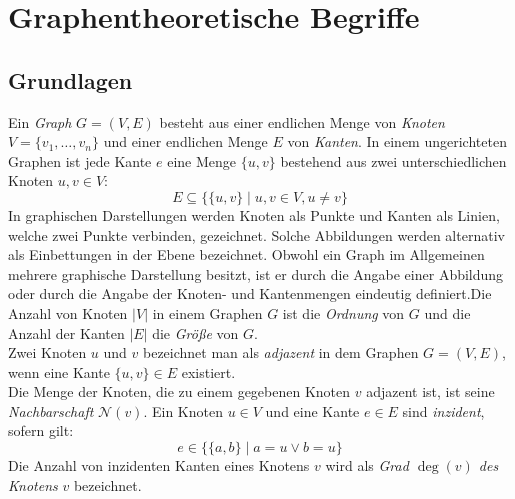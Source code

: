 \section{Graphentheoretische Begriffe}
\label{chap_prel}
\subsection{Grundlagen}
Ein \emph{Graph} $G = (V, E)$ besteht aus einer endlichen Menge von \emph{Knoten} $V = \{v_1 ,\ldots, v_n\}$ und einer endlichen Menge $E$ von \emph{Kanten}. In einem ungerichteten Graphen ist jede Kante $e$ eine Menge $\{u, v\}$ bestehend aus zwei unterschiedlichen Knoten $u, v \in V$:
$$E \subseteq \{\{u, v\}\; |\; u, v \in V, u \neq v\}$$
In graphischen Darstellungen werden Knoten als Punkte und Kanten als Linien, welche zwei Punkte verbinden, gezeichnet. Solche Abbildungen werden alternativ als Einbettungen in der Ebene bezeichnet. Obwohl ein Graph im Allgemeinen mehrere graphische Darstellung besitzt, ist er durch die Angabe einer Abbildung oder durch die Angabe der Knoten- und Kantenmengen eindeutig definiert.\newline \newline Die Anzahl von Knoten $|V|$ in einem Graphen $G$ ist die \emph{Ordnung} von $G$ und die Anzahl der Kanten $|E|$ die \emph{Größe} von $G$.\\Zwei Knoten $u$ und $v$ bezeichnet man als \emph{adjazent} in dem Graphen $G=(V,E)$, wenn eine Kante $\{u, v\} \in E$ existiert.\\Die Menge der Knoten, die zu einem gegebenen Knoten $v$ adjazent ist, ist seine \emph{Nachbarschaft} $\mathcal{N}(v)$. Ein Knoten $u \in V$ und eine Kante $e \in E$ sind \emph{inzident}, sofern gilt: $$e \in \{\{a,b\}\;|\;a=u \vee b=u\}$$ Die Anzahl von inzidenten Kanten eines Knotens $v$ wird als \emph{Grad $\deg(v)$ des Knotens} $v$ bezeichnet.\newline \newline
